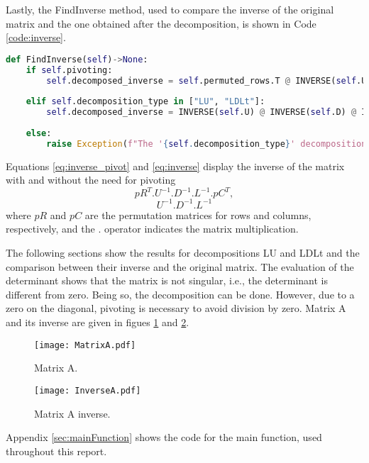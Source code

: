 Lastly, the FindInverse method, used to compare the inverse of the original matrix and the one obtained after the decomposition, is shown in Code \ref{code:inverse}.
\begin{lstlisting}[language=Python, caption={FindInverse method.}, label={code:inverse}]
def FindInverse(self)->None:
    if self.pivoting:
        self.decomposed_inverse = self.permuted_rows.T @ INVERSE(self.U) @ INVERSE(self.D) @ INVERSE(self.L) @ self.permuted_cols.T
    
    elif self.decomposition_type in ["LU", "LDLt"]:
        self.decomposed_inverse = INVERSE(self.U) @ INVERSE(self.D) @ INVERSE(self.L)
    
    else:
        raise Exception(f"The '{self.decomposition_type}' decomposition is not valid.")
\end{lstlisting}

Equations \eqref{eq:inverse_pivot} and \eqref{eq:inverse} display the inverse of the matrix with and without the need for pivoting
\begin{equation}
    \label{eq:inverse_pivot}
    pR^T.U^{-1}.D^{-1}.L^{-1}.pC^T,    
\end{equation}
\begin{equation}
    \label{eq:inverse}
    U^{-1}.D^{-1}.L^{-1}
\end{equation}
where $pR$ and $pC$ are the permutation matrices for rows and columns, respectively, and the $.$ operator indicates the matrix multiplication.

The following sections show the results for decompositions LU and LDLt and the comparison between their inverse and the original matrix. The evaluation of the determinant shows that the matrix is not singular, i.e., the determinant is different from zero. Being so, the decomposition can be done. However, due to a zero on the diagonal, pivoting is necessary to avoid division by zero. Matrix A and its inverse are given in figues \ref{fig:matrix_A} and \ref{fig:matrix_A_inverse}.
\begin{figure}[H]
    \centering 
    \texttt{[image: MatrixA.pdf]}
    \caption{Matrix A.}
    \label{fig:matrix_A}
\end{figure}
\begin{figure}[H]
    \centering 
    \texttt{[image: InverseA.pdf]}
    \caption{Matrix A inverse.}
    \label{fig:matrix_A_inverse}
\end{figure}

Appendix \ref{sec:mainFunction} shows the code for the main function, used throughout this report.

